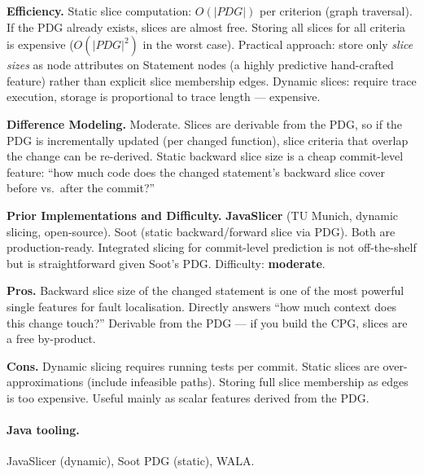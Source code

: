 \documentclass[12pt,a4paper]{article}
\begin{document}
\begin{effbox}
\textbf{Efficiency.}
Static slice computation: $O(|PDG|)$ per criterion (graph traversal). If the
PDG already exists, slices are almost free. Storing all slices for all criteria
is expensive ($O(|PDG|^2)$ in the worst case). Practical approach: store only
\emph{slice sizes} as node attributes on Statement nodes (a highly predictive
hand-crafted feature) rather than explicit slice membership edges.
Dynamic slices: require trace execution, storage is proportional to trace
length --- expensive.
\end{effbox}

\begin{diffbox}
\textbf{Difference Modeling.}
Moderate. Slices are derivable from the PDG, so if the PDG is incrementally
updated (per changed function), slice criteria that overlap the change can be
re-derived. Static backward slice size is a cheap commit-level feature:
``how much code does the changed statement's backward slice cover before
vs.\ after the commit?''
\end{diffbox}

\begin{implbox}
\textbf{Prior Implementations and Difficulty.}
\textbf{JavaSlicer} (TU Munich, dynamic slicing, open-source).
Soot (static backward/forward slice via PDG). Both are production-ready.
Integrated slicing for commit-level prediction is not off-the-shelf but
is straightforward given Soot's PDG. Difficulty: \textbf{moderate}.
\end{implbox}

\begin{prosbox}
\textbf{Pros.}
Backward slice size of the changed statement is one of the most powerful
single features for fault localisation. Directly answers ``how much context
does this change touch?'' Derivable from the PDG --- if you build the CPG,
slices are a free by-product.
\end{prosbox}

\begin{consbox}
\textbf{Cons.}
Dynamic slicing requires running tests per commit. Static slices are
over-approximations (include infeasible paths). Storing full slice membership
as edges is too expensive. Useful mainly as scalar features derived from the PDG.
\end{consbox}

\paragraph{Java tooling.} JavaSlicer (dynamic), Soot PDG (static), WALA.
\end{document}
